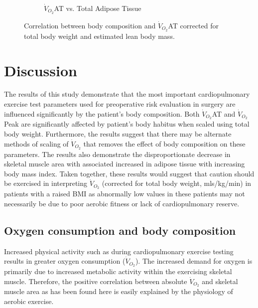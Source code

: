 \begin{figure}[htb]
\begin{subfigure}[b]{0.45\textwidth}
		\caption{$\dot{V}_{O_2}$AT vs. 
Total Adipose Tissue}
		\label{fig:bc_scatter_VO2_TAT_elbm}
	\end{subfigure}
	\caption{Correlation between body composition and $\dot{V}_{O_2}$AT corrected for total body weight and estimated lean body mass.}
	\label{fig:bc_scatter_VO2_bodycomp_elbm}
\end{figure}



\clearpage

\section{Discussion}

The results of this study demonstrate that the most important cardiopulmonary exercise test parameters used for preoperative risk evaluation in surgery are influenced significantly by the patient's body composition. 
Both $\dot{V}_{O_2}$AT and $\dot{V}_{O_2}$Peak are significantly affected by patient's body habitus when scaled using total body weight. 
Furthermore, the results suggest that there may be alternate methods of scaling of $\dot{V}_{O_2}$ that removes the effect of body composition on these parameters. 
The results also demonstrate the disproportionate decrease in skeletal muscle area with associated increased in adipose tissue with increasing body mass index. 
Taken together, these results would suggest that caution should be exercised in interpreting $\dot{V}_{O_2}$ (corrected for total body weight, mls/kg/min) in patients with a raised BMI as abnormally low values in these patients may not necessarily be due to poor aerobic fitness or lack of cardiopulmonary reserve. 

\subsection{Oxygen consumption and body composition}

Increased physical activity such as during cardiopulmonary exercise testing results in greater oxygen consumption ($\dot{V}_{O_2}$). 
The increased demand for oxygen is primarily due to increased metabolic activity within the exercising skeletal muscle.  Therefore, the positive correlation between absolute $\dot{V}_{O_2}$ and skeletal muscle area as has been found here is easily explained by the physiology of aerobic exercise. 

